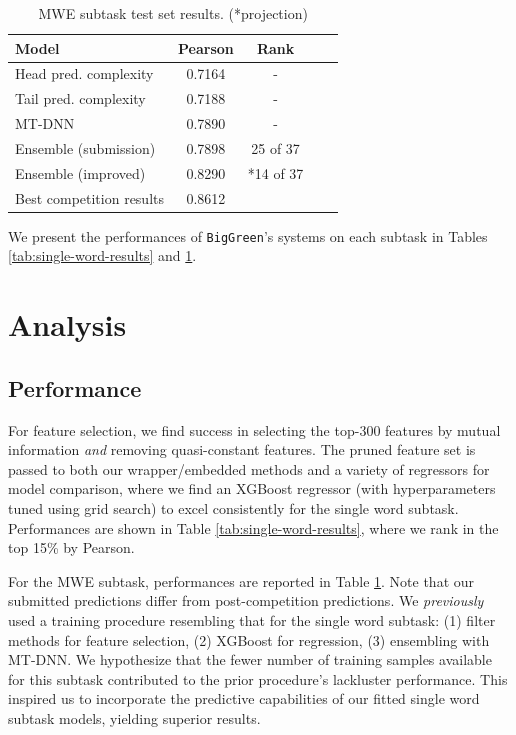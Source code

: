 \documentclass[11pt,a4paper]{article}
\begin{document}
\begin{table}
  \centering
  \begin{tabular}{lcccc}
  \hline \textbf{Model} & \textbf{Pearson} & \textbf{Rank} \\ \hline
  Head pred. complexity & 0.7164 & - \\
  Tail pred. complexity & 0.7188 & - \\
  MT-DNN & 0.7890 & - \\
  Ensemble (submission) & 0.7898 & 25 of 37 \\
  Ensemble (improved) & 0.8290 & *14 of 37 \\
  \hline
  Best competition results & 0.8612 & \\ 
  \hline
  \end{tabular}
  \caption{\label{tab:multi-word-results} MWE subtask test set results. (*projection)}
\end{table}

We present the performances of \texttt{BigGreen}'s systems on each subtask in Tables \ref{tab:single-word-results} and \ref{tab:multi-word-results}.

\section{Analysis}

\subsection{Performance}

For feature selection, we find success in selecting the top-300 features by mutual information \textit{and} removing quasi-constant features. The pruned feature set is passed to both our wrapper/embedded methods and a variety of regressors for model comparison, where we find an XGBoost regressor \citep{DBLP:journals/corr/ChenG16} (with hyperparameters tuned using grid search) to excel consistently for the single word subtask. Performances are shown in Table \ref{tab:single-word-results}, where we rank in the top 15\% by Pearson. 

For the MWE subtask, performances are reported in Table \ref{tab:multi-word-results}. Note that our submitted predictions differ from post-competition predictions. We \textit{previously} used a training procedure resembling that for the single word subtask: (1) filter methods for feature selection, (2) XGBoost for regression, (3) ensembling with MT-DNN. We hypothesize that the fewer number of training samples available for this subtask contributed to the prior procedure's lackluster performance. This inspired us to incorporate the predictive capabilities of our fitted single word subtask models, yielding superior results.
\end{document}
